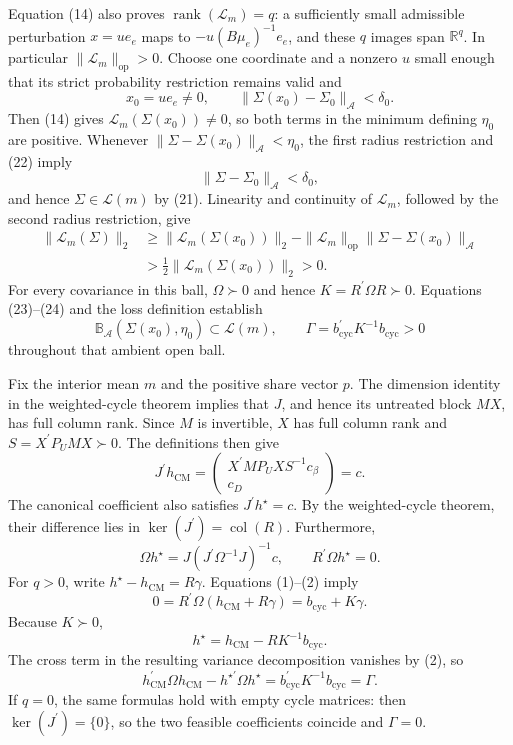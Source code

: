 Equation (14) also proves \(\operatorname{rank}(\mathcal L_m)=q\): a sufficiently small admissible perturbation \(x=ue_e\) maps to
\(-u(B\mu_e)^{-1}e_e\), and these \(q\) images span \(\mathbb R^q\).  In particular \(\|\mathcal L_m\|_{\mathrm{op}}>0\).  Choose one coordinate and a nonzero \(u\) small enough that its strict probability restriction remains valid and
\[
x_0=ue_e\ne0,
\qquad
\|\Sigma(x_0)-\Sigma_0\|_{\mathcal A}<\delta_0.                        \tag{22}
\]
Then (14) gives \(\mathcal L_m(\Sigma(x_0))\ne0\), so both terms in the minimum defining \(\eta_0\) are positive.  Whenever
\(\|\Sigma-\Sigma(x_0)\|_{\mathcal A}<\eta_0\), the first radius restriction and (22) imply
\[
\|\Sigma-\Sigma_0\|_{\mathcal A}<\delta_0,                            \tag{23}
\]
and hence \(\Sigma\in\mathcal L(m)\) by (21).  Linearity and continuity of \(\mathcal L_m\), followed by the second radius restriction, give
\[
\begin{aligned}
\|\mathcal L_m(\Sigma)\|_2
&\ge \|\mathcal L_m(\Sigma(x_0))\|_2
-\|\mathcal L_m\|_{\mathrm{op}}
 \|\Sigma-\Sigma(x_0)\|_{\mathcal A}\\
&>\tfrac12\|\mathcal L_m(\Sigma(x_0))\|_2>0.                          \tag{24}
\end{aligned}
\]
For every covariance in this ball, \(\Omega\succ0\) and hence
\(K=R^{\prime}\Omega R\succ0\).  Equations (23)--(24) and the loss definition establish
\[
\mathbb B_{\mathcal A}(\Sigma(x_0),\eta_0)\subset\mathcal L(m),
\qquad
\Gamma=b_{\mathrm{cyc}}^{\prime}K^{-1}b_{\mathrm{cyc}}>0
\]
throughout that ambient open ball.

Fix the interior mean \(m\) and the positive share vector \(p\).  The dimension identity in the weighted-cycle theorem implies that \(J\), and hence its untreated block \(MX\), has full column rank.  Since \(M\) is invertible, \(X\) has full column rank and
\(S=X^{\prime}P_UMX\succ0\).  The definitions then give
\[
J^{\prime}h_{\mathrm{CM}}
=\begin{pmatrix}
X^{\prime}MP_UXS^{-1}c_\beta\\c_D
\end{pmatrix}=c.                                                        \tag{1}
\]
The canonical coefficient also satisfies \(J^{\prime}h^{\star}=c\).  By the weighted-cycle theorem, their difference lies in
\(\ker(J^{\prime})=\operatorname{col}(R)\).  Furthermore,
\[
\Omega h^{\star}
=J(J^{\prime}\Omega^{-1}J)^{-1}c,
\qquad
R^{\prime}\Omega h^{\star}=0.                                         \tag{2}
\]
For \(q>0\), write \(h^{\star}-h_{\mathrm{CM}}=R\gamma\).  Equations (1)--(2) imply
\[
0=R^{\prime}\Omega(h_{\mathrm{CM}}+R\gamma)
=b_{\mathrm{cyc}}+K\gamma.
\]
Because \(K\succ0\),
\[
h^{\star}=h_{\mathrm{CM}}-RK^{-1}b_{\mathrm{cyc}}.                     \tag{3}
\]
The cross term in the resulting variance decomposition vanishes by (2), so
\[
h_{\mathrm{CM}}^{\prime}\Omega h_{\mathrm{CM}}
-h^{\star\prime}\Omega h^{\star}
=b_{\mathrm{cyc}}^{\prime}K^{-1}b_{\mathrm{cyc}}
=\Gamma.                                                               \tag{4}
\]
If \(q=0\), the same formulas hold with empty cycle matrices: then
\(\ker(J^{\prime})=\{0\}\), so the two feasible coefficients coincide and \(\Gamma=0\).


